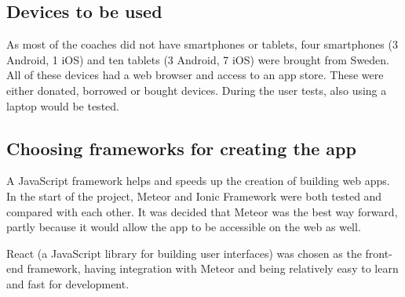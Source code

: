 \subsection{Devices to be used}
As most of the coaches did not have smartphones or tablets, four smartphones (3 Android, 1 iOS) and ten tablets (3 Android, 7 iOS) were brought from Sweden. All of these devices had a web browser and access to an app store. These were either donated, borrowed or bought devices. During the user tests, also using a laptop would be tested.


\subsection{Choosing frameworks for creating the app}

A JavaScript framework helps and speeds up the creation of building web apps. In the start of the project, Meteor \citep{meteor} and Ionic Framework \citep{ionic} were both tested and compared with each other. It was decided that Meteor was the best way forward, partly because it would allow the app to be accessible on the web as well. %

React \citep{react} (a JavaScript library for building user interfaces) was chosen as the front-end framework, having integration with Meteor and being relatively easy to learn and fast for development.
